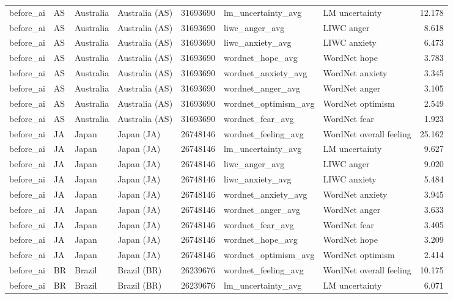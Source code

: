 \begin{tabular}{llllrllr}
before\_ai & AS & Australia & Australia (AS) & 31693690 & lm\_uncertainty\_avg & LM uncertainty & 12.178 \\
before\_ai & AS & Australia & Australia (AS) & 31693690 & liwc\_anger\_avg & LIWC anger & 8.618 \\
before\_ai & AS & Australia & Australia (AS) & 31693690 & liwc\_anxiety\_avg & LIWC anxiety & 6.473 \\
before\_ai & AS & Australia & Australia (AS) & 31693690 & wordnet\_hope\_avg & WordNet hope & 3.783 \\
before\_ai & AS & Australia & Australia (AS) & 31693690 & wordnet\_anxiety\_avg & WordNet anxiety & 3.345 \\
before\_ai & AS & Australia & Australia (AS) & 31693690 & wordnet\_anger\_avg & WordNet anger & 3.105 \\
before\_ai & AS & Australia & Australia (AS) & 31693690 & wordnet\_optimism\_avg & WordNet optimism & 2.549 \\
before\_ai & AS & Australia & Australia (AS) & 31693690 & wordnet\_fear\_avg & WordNet fear & 1.923 \\
before\_ai & JA & Japan & Japan (JA) & 26748146 & wordnet\_feeling\_avg & WordNet overall feeling & 25.162 \\
before\_ai & JA & Japan & Japan (JA) & 26748146 & lm\_uncertainty\_avg & LM uncertainty & 9.627 \\
before\_ai & JA & Japan & Japan (JA) & 26748146 & liwc\_anger\_avg & LIWC anger & 9.020 \\
before\_ai & JA & Japan & Japan (JA) & 26748146 & liwc\_anxiety\_avg & LIWC anxiety & 5.484 \\
before\_ai & JA & Japan & Japan (JA) & 26748146 & wordnet\_anxiety\_avg & WordNet anxiety & 3.945 \\
before\_ai & JA & Japan & Japan (JA) & 26748146 & wordnet\_anger\_avg & WordNet anger & 3.633 \\
before\_ai & JA & Japan & Japan (JA) & 26748146 & wordnet\_fear\_avg & WordNet fear & 3.405 \\
before\_ai & JA & Japan & Japan (JA) & 26748146 & wordnet\_hope\_avg & WordNet hope & 3.209 \\
before\_ai & JA & Japan & Japan (JA) & 26748146 & wordnet\_optimism\_avg & WordNet optimism & 2.414 \\
before\_ai & BR & Brazil & Brazil (BR) & 26239676 & wordnet\_feeling\_avg & WordNet overall feeling & 10.175 \\
before\_ai & BR & Brazil & Brazil (BR) & 26239676 & lm\_uncertainty\_avg & LM uncertainty & 6.071 \\

\end{tabular}
